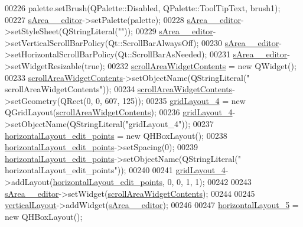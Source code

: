\begin{DoxyCode}
00226         palette.setBrush(QPalette::Disabled, QPalette::ToolTipText, brush1);
00227         \hyperlink{a00079_a6f79b6b1fe81457d76b076a543ee4089}{sArea\_\_editor}->setPalette(palette);
00228         \hyperlink{a00079_a6f79b6b1fe81457d76b076a543ee4089}{sArea\_\_editor}->setStyleSheet(QStringLiteral(\textcolor{stringliteral}{""}));
00229         \hyperlink{a00079_a6f79b6b1fe81457d76b076a543ee4089}{sArea\_\_editor}->setVerticalScrollBarPolicy(Qt::ScrollBarAlwaysOff);
00230         \hyperlink{a00079_a6f79b6b1fe81457d76b076a543ee4089}{sArea\_\_editor}->setHorizontalScrollBarPolicy(Qt::ScrollBarAsNeeded);
00231         \hyperlink{a00079_a6f79b6b1fe81457d76b076a543ee4089}{sArea\_\_editor}->setWidgetResizable(\textcolor{keyword}{true});
00232         \hyperlink{a00079_a2fd25ae1a2b71980cbe9b9ba2751da3b}{scrollAreaWidgetContents} = \textcolor{keyword}{new} QWidget();
00233         \hyperlink{a00079_a2fd25ae1a2b71980cbe9b9ba2751da3b}{scrollAreaWidgetContents}->setObjectName(QStringLiteral(\textcolor{stringliteral}{"
      scrollAreaWidgetContents"}));
00234         \hyperlink{a00079_a2fd25ae1a2b71980cbe9b9ba2751da3b}{scrollAreaWidgetContents}->setGeometry(QRect(0, 0, 607, 125));
00235         \hyperlink{a00079_a8e397832e536976b6717e1d509226b8d}{gridLayout\_4} = \textcolor{keyword}{new} QGridLayout(\hyperlink{a00079_a2fd25ae1a2b71980cbe9b9ba2751da3b}{scrollAreaWidgetContents});
00236         \hyperlink{a00079_a8e397832e536976b6717e1d509226b8d}{gridLayout\_4}->setObjectName(QStringLiteral(\textcolor{stringliteral}{"gridLayout\_4"}));
00237         \hyperlink{a00079_ae08b661288ecee049945e4a63d0c0af0}{horizontalLayout\_edit\_points} = \textcolor{keyword}{new} QHBoxLayout();
00238         \hyperlink{a00079_ae08b661288ecee049945e4a63d0c0af0}{horizontalLayout\_edit\_points}->setSpacing(0);
00239         \hyperlink{a00079_ae08b661288ecee049945e4a63d0c0af0}{horizontalLayout\_edit\_points}->setObjectName(QStringLiteral(\textcolor{stringliteral}{"
      horizontalLayout\_edit\_points"}));
00240 
00241         \hyperlink{a00079_a8e397832e536976b6717e1d509226b8d}{gridLayout\_4}->addLayout(\hyperlink{a00079_ae08b661288ecee049945e4a63d0c0af0}{horizontalLayout\_edit\_points}, 0, 0,
       1, 1);
00242 
00243         \hyperlink{a00079_a6f79b6b1fe81457d76b076a543ee4089}{sArea\_\_editor}->setWidget(\hyperlink{a00079_a2fd25ae1a2b71980cbe9b9ba2751da3b}{scrollAreaWidgetContents});
00244 
00245         \hyperlink{a00079_a11b9c1ae90724f0bcd67c76045c93704}{verticalLayout}->addWidget(\hyperlink{a00079_a6f79b6b1fe81457d76b076a543ee4089}{sArea\_\_editor});
00246 
00247         \hyperlink{a00079_ade915b192b206af66ce1fb317087ffb6}{horizontalLayout\_5} = \textcolor{keyword}{new} QHBoxLayout();

\end{DoxyCode}
